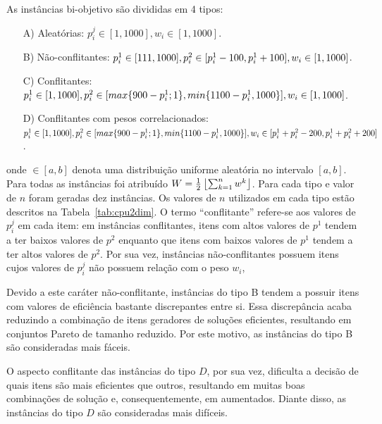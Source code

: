 As instâncias bi-objetivo são divididas em 4 tipos:
\begin{enumerate}
  \item[A)] Aleatórias: $
    p^j_i \in [1, 1000],
    w_i \in [1,1000]$.
  \item[B)] Não-conflitantes: $
    p^1_i \in [111, 1000],\\
    p^2_i \in [p^1_i - 100, p^1_i + 100],\\
    w_i \in [1,1000]$.
  \item[C)] Conflitantes: $
    p^1_i \in [1, 1000],\\
    p^2_i \in [max\{900-p^1_i;1\}, min\{1100-p^1_i, 1000\}],\\
    w_i \in [1,1000]$.
  \item[D)] Conflitantes com pesos correlacionados: $
    p^1_i \in [1, 1000],\\
    p^2_i \in [max\{900-p^1_i;1\}, min\{1100-p^1_i, 1000\}],\\
    w_i \in [p^1_i+p^2_i-200, p^1_i+p^2_i+200]$.
\end{enumerate}
onde $\in [a,b]$ denota uma distribuição uniforme aleatória no intervalo $[a,b]$.
Para todas as instâncias foi atribuído $W=\frac{1}{2}\left \lfloor{\sum^n_{k=1} w^k}\right \rfloor$.
Para cada tipo e valor de $n$ foram geradas dez instâncias.
Os valores de $n$ utilizados em cada tipo estão descritos na Tabela~\ref{tab:cpu2dim}.
O termo ``conflitante'' refere-se aos valores de $p^j_i$ em cada item:
em instâncias conflitantes, itens com altos valores de $p^1$ tendem a ter
baixos valores de $p^2$ enquanto que itens com baixos valores de $p^1$ tendem a ter
altos valores de $p^2$.
Por sua vez, instâncias não-conflitantes possuem itens cujos valores de $p^j_i$ não possuem
relação com o peso $w_i$,

Devido a este caráter não-conflitante, instâncias do tipo B
tendem a possuir itens com valores de eficiência bastante discrepantes entre si.
Essa discrepância acaba reduzindo a combinação de itens geradores de soluções eficientes,
resultando em conjuntos Pareto de tamanho reduzido.
Por este motivo, as instâncias do tipo B são consideradas mais fáceis.

O aspecto conflitante das instâncias do tipo $D$, por sua vez, dificulta a decisão
de quais itens são mais eficientes que outros, resultando em
muitas boas combinações de solução e, consequentemente, em \paretoset{} aumentados.
Diante disso, as instâncias do tipo $D$ são consideradas mais difíceis.

